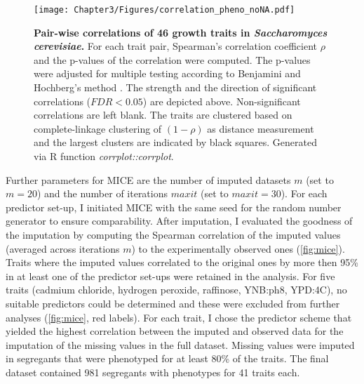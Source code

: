 \begin{figure}[hbtp]
	\centering
	\texttt{[image: Chapter3/Figures/correlation\_pheno\_noNA.pdf]}
	\caption[\textbf{Pairwise correlations of \num{46} growth traits in \emph{Saccharomyces cerevisiae}.}]{\textbf{Pair-wise correlations of \num{46} growth traits in \emph{Saccharomyces cerevisiae}.} For each trait pair, Spearman's correlation coefficient \(\rho\) and the p-values of the correlation were computed. The p-values were adjusted for multiple testing according to Benjamini and Hochberg's method \citep{Benjamini1995}. The strength and the direction of significant correlations (\(FDR < 0.05\)) are depicted above. Non-significant correlations are left blank. The traits are clustered based on complete-linkage clustering of \((1-\rho)\) as distance measurement and the largest clusters are indicated by black squares. Generated via R function \textit{corrplot::corrplot}.}
 	\label{fig:traitcorrelations}
\end{figure}


Further parameters for MICE are the number of imputed datasets \(m\) (set to \(m=20\)) and the number of iterations \(maxit\) (set to \(maxit=30\)). For each predictor set-up, I initiated MICE with the same seed for the random number generator to ensure comparability. After imputation, I evaluated the goodness of the imputation  by computing the Spearman correlation of the imputed values (averaged across iterations \(m\)) to the experimentally observed ones (\cref{fig:mice}). Traits where the imputed values correlated to the original ones by more then \num{95}\% in at least one of the predictor set-ups were retained in the analysis. For five traits (cadmium chloride, hydrogen peroxide, raffinose, YNB:ph8, YPD:4C), no suitable predictors could be determined and these were excluded from further analyses (\cref{fig:mice}, red labels). For each trait, I chose the predictor scheme that yielded the highest correlation between the imputed and observed data for the imputation of the missing values in the full dataset. Missing values were imputed in segregants that were phenotyped for at least \num{80}\% of the traits. The final dataset contained \num{981} segregants with phenotypes for \num{41} traits each. 
 	
